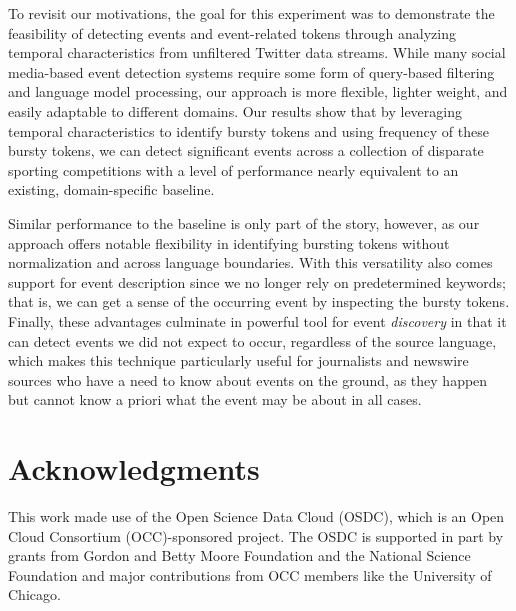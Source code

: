\documentclass{acm_proc_article-sp}
\begin{document}
To revisit our motivations, the goal for this experiment was to demonstrate the feasibility of detecting events and event-related tokens through analyzing temporal characteristics from unfiltered Twitter data streams.
While many social media-based event detection systems require some form of query-based filtering and language model processing, our approach is more flexible, lighter weight, and easily adaptable to different domains.
Our results show that by leveraging temporal characteristics to identify bursty tokens and using frequency of these bursty tokens, we can detect significant events across a collection of disparate sporting competitions with a level of performance nearly equivalent to an existing, domain-specific baseline.

Similar performance to the baseline is only part of the story, however, as our approach offers notable flexibility in identifying bursting tokens without normalization and across language boundaries.
With this versatility also comes support for event description since we no longer rely on predetermined keywords; that is, we can get a sense of the occurring event by inspecting the bursty tokens.
Finally, these advantages culminate in powerful tool for event \emph{discovery} in that it can detect events we did not expect to occur, regardless of the source language, which makes this technique particularly useful for journalists and newswire sources who have a need to know about events on the ground, as they happen but cannot know a priori what the event may be about in all cases.


\section{Acknowledgments}
This work made use of the Open Science Data Cloud (OSDC), which is an Open Cloud Consortium (OCC)-sponsored project. 
The OSDC is supported in part by grants from Gordon and Betty Moore Foundation and the National Science Foundation and major contributions from OCC members like the University of Chicago. 

%

%
%
\end{document}
